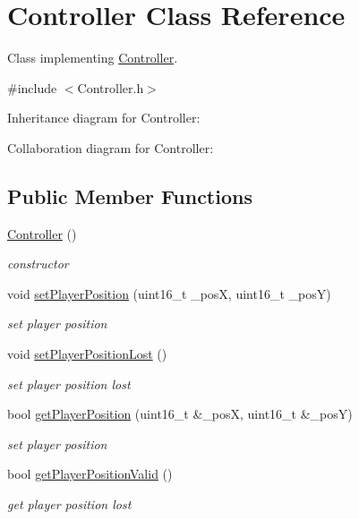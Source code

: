 \hypertarget{class_controller}{\section{Controller Class Reference}
\label{class_controller}
}


Class implementing \hyperlink{class_controller}{Controller}.  




{\ttfamily \#include $<$Controller.\+h$>$}



Inheritance diagram for Controller\+:


Collaboration diagram for Controller\+:
\subsection*{Public Member Functions}
\begin{DoxyCompactItemize}
\item 
\hyperlink{class_controller_a95c56822d667e94b031451729ce069a9}{Controller} ()
\begin{DoxyCompactList}\small\item\em constructor \end{DoxyCompactList}\item 
void \hyperlink{class_controller_a1e0386749b623bc94b89fe832b72af1e}{set\+Player\+Position} (uint16\+\_\+t \+\_\+pos\+X, uint16\+\_\+t \+\_\+pos\+Y)
\begin{DoxyCompactList}\small\item\em set player position \end{DoxyCompactList}\item 
void \hyperlink{class_controller_a01231af4ac9630c21fa7b8eb358b9c66}{set\+Player\+Position\+Lost} ()
\begin{DoxyCompactList}\small\item\em set player position lost \end{DoxyCompactList}\item 
bool \hyperlink{class_controller_ad8bd69a309ce9fd6b393a01c3d9bfb8c}{get\+Player\+Position} (uint16\+\_\+t \&\+\_\+pos\+X, uint16\+\_\+t \&\+\_\+pos\+Y)
\begin{DoxyCompactList}\small\item\em set player position \end{DoxyCompactList}\item 
bool \hyperlink{class_controller_aea72e1ee0c1e0cdaf095be580dfd7043}{get\+Player\+Position\+Valid} ()
\begin{DoxyCompactList}\small\item\em get player position lost \end{DoxyCompactList}\end{DoxyCompactItemize}
